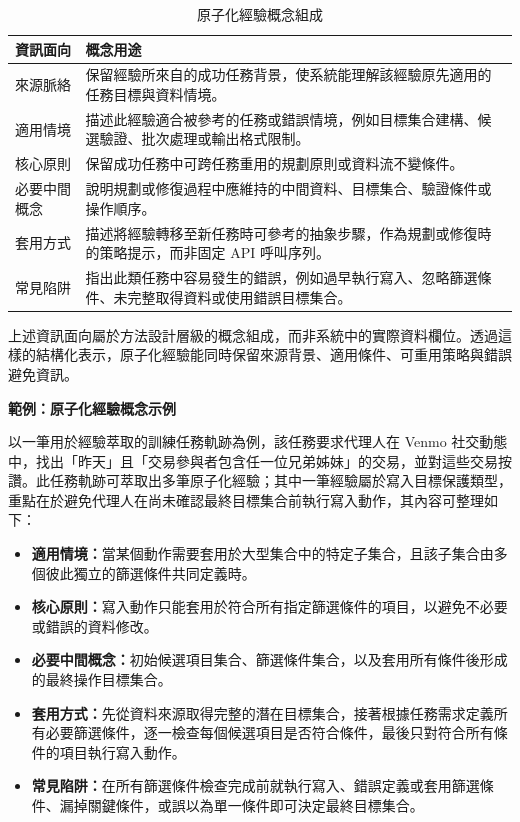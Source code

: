 \begin{ZhChapter}
\begin{table}[htbp]
    \centering
    \caption{原子化經驗概念組成}
    \label{tab:atomic_experience_schema}
    \small
    \renewcommand{\arraystretch}{1.15}
    \begin{tabularx}{0.95\textwidth}{
        >{\raggedright\arraybackslash}p{}
        >{\raggedright\arraybackslash}X
    }
        \hline
        \textbf{資訊面向} & \textbf{概念用途} \\
        \hline
        來源脈絡 &
        保留經驗所來自的成功任務背景，使系統能理解該經驗原先適用的任務目標與資料情境。 \\[0.35em]
        適用情境 &
        描述此經驗適合被參考的任務或錯誤情境，例如目標集合建構、候選驗證、批次處理或輸出格式限制。 \\[0.35em]
        核心原則 &
        保留成功任務中可跨任務重用的規劃原則或資料流不變條件。 \\[0.35em]
        必要中間概念 &
        說明規劃或修復過程中應維持的中間資料、目標集合、驗證條件或操作順序。 \\[0.35em]
        套用方式 &
        描述將經驗轉移至新任務時可參考的抽象步驟，作為規劃或修復時的策略提示，而非固定 API 呼叫序列。 \\[0.35em]
        常見陷阱 &
        指出此類任務中容易發生的錯誤，例如過早執行寫入、忽略篩選條件、未完整取得資料或使用錯誤目標集合。 \\
        \hline
    \end{tabularx}
\end{table}

上述資訊面向屬於方法設計層級的概念組成，而非系統中的實際資料欄位。透過這樣的結構化表示，原子化經驗能同時保留來源背景、適用條件、可重用策略與錯誤避免資訊。

\vspace{0.5em}
\noindent\textbf{範例：原子化經驗概念示例}
\vspace{0.25em}

以一筆用於經驗萃取的訓練任務軌跡為例，該任務要求代理人在 Venmo 社交動態中，找出「昨天」且「交易參與者包含任一位兄弟姊妹」的交易，並對這些交易按讚。此任務軌跡可萃取出多筆原子化經驗；其中一筆經驗屬於寫入目標保護類型，重點在於避免代理人在尚未確認最終目標集合前執行寫入動作，其內容可整理如下：

\begin{itemize}
    \item \textbf{適用情境：}當某個動作需要套用於大型集合中的特定子集合，且該子集合由多個彼此獨立的篩選條件共同定義時。
    \item \textbf{核心原則：}寫入動作只能套用於符合所有指定篩選條件的項目，以避免不必要或錯誤的資料修改。
    \item \textbf{必要中間概念：}初始候選項目集合、篩選條件集合，以及套用所有條件後形成的最終操作目標集合。
    \item \textbf{套用方式：}先從資料來源取得完整的潛在目標集合，接著根據任務需求定義所有必要篩選條件，逐一檢查每個候選項目是否符合條件，最後只對符合所有條件的項目執行寫入動作。
    \item \textbf{常見陷阱：}在所有篩選條件檢查完成前就執行寫入、錯誤定義或套用篩選條件、漏掉關鍵條件，或誤以為單一條件即可決定最終目標集合。
\end{itemize}


\end{ZhChapter}
